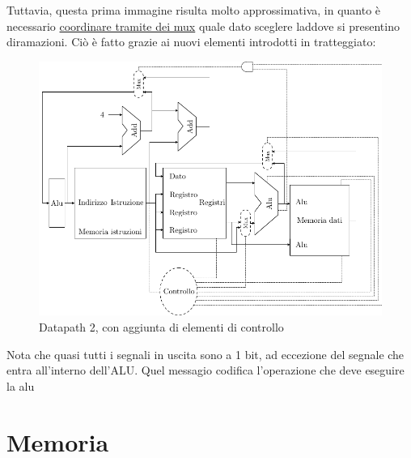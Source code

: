 Tuttavia, questa prima immagine risulta molto approssimativa, in quanto è necessario \underline{coordinare tramite dei mux} quale dato sceglere laddove si presentino diramazioni. Ciò è fatto grazie ai nuovi elementi introdotti in tratteggiato:
\begin{figure}[H]
  \begin{center}
      \includegraphics{Images/Datapath2.pdf} 
  \end{center}
  \caption{Datapath 2, con aggiunta di elementi di controllo}
\end{figure}
Nota che quasi tutti i segnali in uscita sono a 1 bit, ad eccezione del segnale che entra all'interno dell'ALU. Quel messagio codifica l'operazione che deve eseguire la alu
\section{Memoria}
